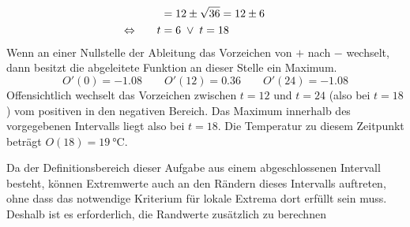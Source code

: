\begin{exercise}
\begin{enumerate}[a)]
\begin{alignat*}{3}
              \relax&\quad
              &
              &=12\pm\sqrt{36}=12\pm6
              &
              \quad&\relax
              \\
              \Leftrightarrow&\quad
              &
              t&=6\;\lor\;t=18
              &
              \quad&\relax
            \end{alignat*}
            Wenn an einer Nullstelle der Ableitung das
            Vorzeichen von $+$ nach $-$ wechselt, dann
            besitzt die abgeleitete Funktion an dieser
            Stelle ein Maximum.
            \begin{equation*}
              O'(\num{0})=-\num{1.08}
              \qquad
              O'(\num{12})=\num{0.36}
              \qquad
              O'(\num{24})=-\num{1.08}
            \end{equation*}
            Offensichtlich wechselt das Vorzeichen
            zwischen $t=12$ und $t=24$ (also bei
            $t=18$) vom positiven in den negativen
            Bereich. Das Maximum innerhalb des
            vorgegebenen Intervalls liegt also
            bei $t=18$.
            Die Temperatur zu diesem Zeitpunkt
            beträgt $O(18)=\SI{19}{\celsius}$.
            \par
            Da der Definitionsbereich dieser
            Aufgabe aus einem abgeschlossenen
            Intervall besteht, können Extremwerte
            auch an den Rändern dieses Intervalls
            auftreten, ohne dass das notwendige
            Kriterium für lokale Extrema dort
            erfüllt sein muss.
            Deshalb ist es erforderlich, die
            Randwerte zusätzlich zu berechnen

\end{enumerate}
\end{exercise}

